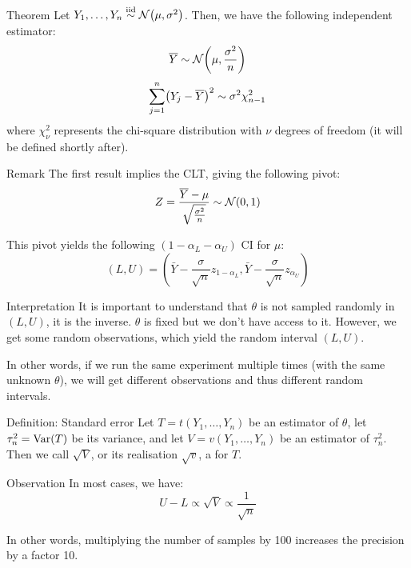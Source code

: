 \documentclass[a4paper]{article}
\begin{document}
\begin{parag}{Theorem}
    Let $Y_1, \ldots, Y_n \iid \mathcal{N}\left(\mu, \sigma^2\right)$. Then, we have the following independent estimator: 
    \[\bar{Y} \followsdistr \mathcal{N}\left(\mu, \frac{\sigma^2}{n}\right)\]
    \[\sum_{j=1}^{n} \left(Y_j - \bar{Y}\right)^2 \followsdistr \sigma^2 \chi^2_{n-1}\]
    where $\chi_{\nu}^2$ represents the chi-square distribution with $\nu$ degrees of freedom (it will be defined shortly after).

    \begin{subparag}{Remark}
        The first result implies the CLT, giving the following pivot: 
        \[Z = \frac{\bar{Y} - \mu}{\sqrt{\frac{\sigma^2}{n}}} \followsdistr \mathcal{N}\left(0, 1\right)\]

        This pivot yields the following $\left(1 - \alpha_L - \alpha_U\right)$ CI for $\mu$: 
        \[\left(L, U\right) = \left(\bar{Y} - \frac{\sigma}{\sqrt{n}} z_{1 - \alpha_L}, \bar{Y} - \frac{\sigma}{\sqrt{n}} z_{\alpha_U}\right)\]
    \end{subparag}
\end{parag}

\begin{parag}{Interpretation}
    It is important to understand that $\theta$ is not sampled randomly in $\left(L, U\right)$, it is the inverse. $\theta$ is fixed but we don't have access to it. However, we get some random observations, which yield the random interval $\left(L, U\right)$. 

    In other words, if we run the same experiment multiple times (with the same unknown $\theta$), we will get different observations and thus different random intervals.
\end{parag}

\begin{parag}{Definition: Standard error}
    Let $T = t\left(Y_1, \ldots, Y_n\right)$ be an estimator of $\theta$, let $\tau_n^2 = \Var\left(T\right)$ be its variance, and let $V = v\left(Y_1, \ldots, Y_n\right)$ be an estimator of $\tau_n^2$. Then we call $\sqrt{V}$, or its realisation $\sqrt{v}$, a  for $T$.
\end{parag}

\begin{parag}{Observation}
    In most cases, we have: 
    \[U - L \propto \sqrt{V} \propto \frac{1}{\sqrt{n}}\]

    In other words, multiplying the number of samples by 100 increases the precision by a factor 10.
\end{parag}
\end{document}
